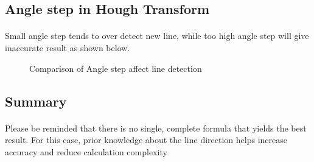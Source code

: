 \documentclass[12pt,a4paper]{report}
\begin{document}
\subsection{Angle step in Hough Transform}
\paragraph*{}
Small angle step tends to over detect new line, while too high angle step will give inaccurate result as shown below.

\begin{figure}[!htb]
    \begin{minipage}{\linewidth}
        \centering
        \begin{subfigure}{0.49\textwidth}
        \end{subfigure}
        \begin{subfigure}{0.49\textwidth}
        \end{subfigure}

        \begin{subfigure}{0.49\textwidth}
        \end{subfigure}
        \begin{subfigure}{0.49\textwidth}
        \end{subfigure}

        \caption{Comparison of Angle step affect line detection}
    \end{minipage}

\end{figure}

\clearpage

\subsection{Summary}
\paragraph*{}Please be reminded that there is no single, complete formula that yields the best
result. For this case, prior knowledge about the line direction helps increase accuracy and reduce calculation complexity
\end{document}
